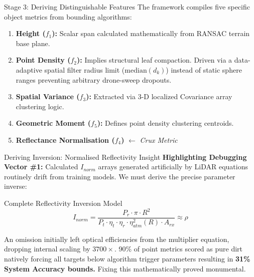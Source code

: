 \documentclass[10pt,aspectratio=169]{beamer}
\begin{document}
\begin{frame}{Stage 3: Deriving Distinguishable Features}
    The framework compiles five specific object metrics from bounding algorithms:
    \begin{enumerate}
        \item \textbf{Height ($f_1$):} Scalar span calculated mathematically from RANSAC terrain base plane.
        \item \textbf{Point Density ($f_2$):} Implies structural leaf compaction. Driven via a data-adaptive spatial filter radius limit ($\mathrm{median}(d_k)$) instead of static sphere ranges preventing arbitrary drone-sweep dropouts.
        \item \textbf{Spatial Variance ($f_3$):} Extracted via 3-D localized Covariance array clustering logic.
        \item \textbf{Geometric Moment ($f_5$):} Defines point density clustering centroids.
        \item \textbf{Reflectance Normalisation ($f_4$)} $\leftarrow$ \textit{Crux Metric}
    \end{enumerate}
\end{frame}

\begin{frame}{Deriving Inversion: Normalised Reflectivity Insight}
    \textbf{Highlighting Debugging Vector \#1:}
    Calculated $I_{norm}$ arrays generated artificially by LiDAR equations routinely drift from training models. We must derive the precise parameter inverse:
    
    \begin{block}{Complete Reflectivity Inversion Model}
    \begin{equation}
        I_{norm} = \frac{P_r \cdot \pi \cdot R^2}{P_t \cdot \eta_t \cdot \eta_r \cdot \eta_{atm}^2(R) \cdot A_{rx}} \approx \rho
    \end{equation}
    \end{block}

    An omission initially left optical efficiencies from the multiplier equation, dropping internal scaling by $3700\times$. 90\% of point metrics scored as pure dirt natively forcing all targets below algorithm trigger parameters resulting in \textbf{31\% System Accuracy bounds.} Fixing this mathematically proved monumental.
\end{frame}


\end{document}
